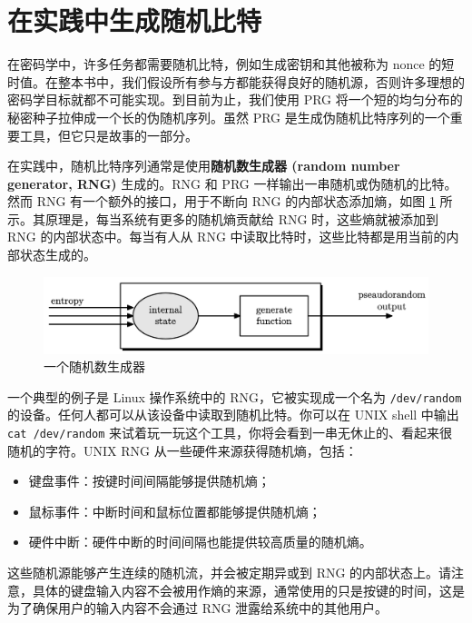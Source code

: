\section{在实践中生成随机比特}

在密码学中，许多任务都需要随机比特，例如生成密钥和其他被称为 nonce 的短时值。在整本书中，我们假设所有参与方都能获得良好的随机源，否则许多理想的密码学目标就都不可能实现。到目前为止，我们使用 PRG 将一个短的均匀分布的秘密种子拉伸成一个长的伪随机序列。虽然 PRG 是生成伪随机比特序列的一个重要工具，但它只是故事的一部分。

在实践中，随机比特序列通常是使用\textbf{随机数生成器 (random number generator, RNG)} 生成的。RNG 和 PRG 一样输出一串随机或伪随机的比特。然而 RNG 有一个额外的接口，用于不断向 RNG 的内部状态添加熵，如图 \ref{fig:3-14} 所示。其原理是，每当系统有更多的随机熵贡献给 RNG 时，这些熵就被添加到 RNG 的内部状态中。每当有人从 RNG 中读取比特时，这些比特都是用当前的内部状态生成的。

\begin{figure}
  \centering
  \includegraphics[width=0.7\linewidth]{figures/chapter3/fig14.png}
  \caption{一个随机数生成器}
  \label{fig:3-14}
\end{figure}

一个典型的例子是 Linux 操作系统中的 RNG，它被实现成一个名为 \texttt{/dev/random} 的设备。任何人都可以从该设备中读取到随机比特。你可以在 UNIX shell 中输出 \texttt{cat /dev/random} 来试着玩一玩这个工具，你将会看到一串无休止的、看起来很随机的字符。UNIX RNG 从一些硬件来源获得随机熵，包括：
\begin{itemize}
	\item 键盘事件：按键时间间隔能够提供随机熵；
	\item 鼠标事件：中断时间和鼠标位置都能够提供随机熵；
	\item 硬件中断：硬件中断的时间间隔也能提供较高质量的随机熵。
\end{itemize}
这些随机源能够产生连续的随机流，并会被定期异或到 RNG 的内部状态上。请注意，具体的键盘输入内容不会被用作熵的来源，通常使用的只是按键的时间，这是为了确保用户的输入内容不会通过 RNG 泄露给系统中的其他用户。

